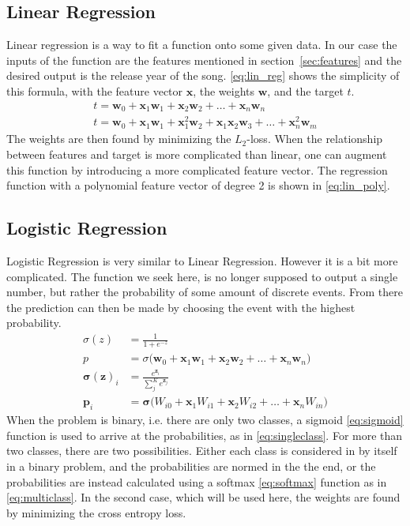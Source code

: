 \documentclass{article}
\begin{document}
\subsection{Linear Regression}\label{sec:lin_reg}
Linear regression is a way to fit a function onto some given data. In our case the inputs of the function are the features mentioned in section~\ref{sec:features} and the desired output is the release year of the song.
\eqref{eq:lin_reg} shows the simplicity of this formula, with the feature vector $\boldsymbol{x}$, the weights $\boldsymbol{w}$, and the target $t$.
\begin{align}
  t = \boldsymbol{w}_0 + \boldsymbol{x}_1\boldsymbol{w}_1 + \boldsymbol{x}_2\boldsymbol{w}_2 + \dots + \boldsymbol{x}_n\boldsymbol{w}_n \label{eq:lin_reg}
  \\
  t = \boldsymbol{w}_0 + \boldsymbol{x}_1\boldsymbol{w}_{1} + \boldsymbol{x}_1^2\boldsymbol{w}_{2} + \boldsymbol{x}_1\boldsymbol{x}_2\boldsymbol{w}_{3} + \dots + \boldsymbol{x}_n^2\boldsymbol{w}_m \label{eq:lin_poly}
\end{align}
The weights are then found by minimizing the $L_2$-loss.
When the relationship between features and target is more complicated than linear, one can augment this function by introducing a more complicated feature vector. The regression function with a polynomial feature vector of degree 2 is shown in \eqref{eq:lin_poly}.


\subsection{Logistic Regression}\label{sec:log_reg}

Logistic Regression is very similar to Linear Regression. However it is a bit more complicated. The function we seek here, is no longer supposed to output a single number, but rather the probability of some amount of discrete events. From there the prediction can then be made by choosing the event with the highest probability.
\begin{align}
  \sigma(z) &= \frac{1}{1+e^{-z}} \label{eq:sigmoid}\\
  p &= \sigma\big(\boldsymbol{w}_0 + \boldsymbol{x}_1\boldsymbol{w}_1+ \boldsymbol{x}_2\boldsymbol{w}_2+ \dots + \boldsymbol{x}_n\boldsymbol{w}_{n}\big) \label{eq:singleclass} \\
  \boldsymbol{\sigma}(\boldsymbol{z})_i &= \frac{e^{\boldsymbol{z}_i}}{\sum_j^K e^{\boldsymbol{z}_j}} \label{eq:softmax} \\
  \boldsymbol{p}_i &= \boldsymbol{\sigma}\Big(W_{i0} + \boldsymbol{x}_1W_{i1}+ \boldsymbol{x}_2W_{i2}+ \dots + \boldsymbol{x}_nW_{in}\Big) \label{eq:multiclass} 
\end{align}
When the problem is binary, i.e. there are only two classes, a sigmoid \eqref{eq:sigmoid} function  is used to arrive at the probabilities, as in \eqref{eq:singleclass}. For more than two classes, there are two possibilities. Either each class is considered in by itself in a binary problem, and the probabilities are normed in the the end, or the probabilities are instead calculated using a softmax \eqref{eq:softmax} function  as in \eqref{eq:multiclass}.
In the second case, which will be used here, the weights are found by minimizing the cross entropy loss. 
\end{document}

